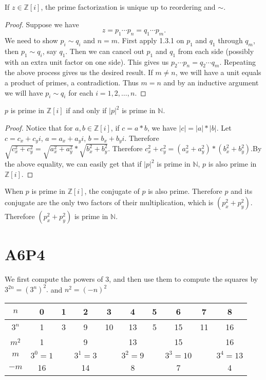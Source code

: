 \documentclass{article}
\begin{document}
\begin{theorem}
If $z \in \mathbb{Z}[i]$, the prime factorization is unique up to reordering and $\sim$.
\end{theorem}

\begin{proof}
Suppose we have
$$z = p_1\cdots p_n = q_1\cdots p_m.$$
We need to show $p_i \sim q_i$ and $n =m$. First apply  1.3.1 on $p_1$ and $q_1$ through $q_m$, then $p_1 \sim q_i$, say $q_1$. Then we can cancel out $p_1$ and $q_1$ from each side (possibly with an extra unit factor on one side). This gives us $p_2\cdots p_n=q_2\cdots q_m$. Repeating the above process gives us the desired result. If $m \neq n$, we will have a unit equals a product of primes, a contradiction. Thus $m =n$ and by an inductive argument we will have $p_i \sim q_i$ for each $i = 1, 2, \ldots, n.$
\end{proof}
\begin{theorem}
 $p$ is prime in $\mathbb{Z}[i]$ if and only if $|p|^2$ is prime in $\mathbb{N}$.
 \end{theorem}

 \begin{proof}
 Notice that for $a,b \in \mathbb{Z}[i]$, if $c = a*b$, we have $|c|= |a| * |b|$. 
 Let $c= c_x + c_yi$, $a= a_x + a_yi$, $b= b_x + b_yi$.
 Therefore $\sqrt{c_x^2 + c_y^2}= \sqrt{a_x^2 + a_y^2}*\sqrt{b_x^2 + b_y^2}$. Therefore $c_x^2 + c_y^2= (a_x^2 + a_y^2)*(b_x^2 + b_y^2)$.By the above equality, we can easily get that if $|p|^2$ is prime in $\mathbb{N}$, $p$ is also prime in 
 $\mathbb{Z}[i]$.
 \end{proof}
 When $p$ is prime in $\mathbb{Z}[i]$, the conjugate of $p$ is also prime. Therefore $p$ and its conjugate are the only two factors of their multiplication, which is 
 $(p_x^2 + p_y^2)$. Therefore $(p_x^2 + p_y^2)$ is prime in $\mathbb{N}$.

\pagebreak
\section{A6P4}
We first compute the powers of 3, and then use them to compute the squares by $3^{2n}=(3^n)^2.$ and $n^2=(-n)^2$
\begin{table}[h]
\begin{tabular}{|c|c|c|c|c|c|c|c|c|c|}
\hline
$n$   & 0       & 1 & 2       & 3  & 4       & 5 & 6        & 7  & 8        \\ \hline
$3^n$ & 1       & 3 & 9       & 10 & 13      & 5 & 15       & 11 & 16       \\ \hline
$m^2$ & 1       &   & 9       &    & 13      &   & 15       &    & 16       \\ \hline
$m$   & $3^0=1$ &   & $3^1=3$ &    & $3^2=9$ &   & $3^3=10$ &    & $3^4=13$ \\ \hline
$-m$  & 16      &   & 14      &    & 8       &   & 7        &    & 4        \\ \hline
\end{tabular}
\end{table}
\end{document}
